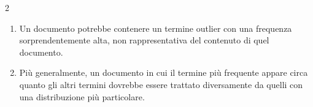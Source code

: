 \documentclass[\main/main.tex]{subfiles}
\begin{document}
\begin{multicols}{2}
\begin{observation}
\begin{enumerate}
        \item Un documento potrebbe contenere un termine outlier con una frequenza sorprendentemente alta, non rappresentativa del contenuto di quel documento.
        \item Più generalmente, un documento in cui il termine più frequente appare circa quanto gli altri termini dovrebbe essere trattato diversamente da quelli con una distribuzione più particolare.
    \end{enumerate}
\end{observation}
\end{multicols}
\end{document}
